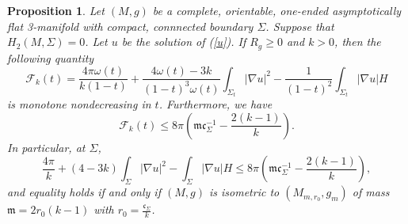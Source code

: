 \documentclass[12pt]{article}
\theoremstyle{definition}
\theoremstyle{plain}
\newtheorem{proposition}{Proposition}[section]
\numberwithin{equation}{section}
\begin{document}
\begin{proposition}\label{F mono}
Let $ (M,g) $ be a complete, orientable, one-ended asymptotically flat 3-manifold with compact, connnected boundary $ \Sigma $. Suppose that $ H_{2}(M,\Sigma)=0 $. Let $ u $ be the solution of (\ref{u}). If $ R_{g}\geq 0 $ and $ k>0 $, then the following quantity 
\begin{equation}\label{F}
\mathcal{F}_{k}(t)=\frac{4\pi\omega(t)}{k(1-t)}+\frac{4\omega(t)-3k}{(1-t)^{3}\omega(t)}\int_{\Sigma_{t}}|\nabla u|^{2}-\frac{1}{(1-t)^{2}}\int_{\Sigma_{t}}|\nabla u|H
\end{equation}
is monotone nondecreasing in $ t $. Furthermore, we have 
\begin{equation}\label{lim F}
\mathcal{F}_{k}(t)\leq 8\pi(\mathfrak{m}\mathfrak{c}_{\Sigma}^{-1}-\frac{2(k-1)}{k}).
\end{equation}
In particular, at $ \Sigma $,
\begin{equation}\label{F 0}
\frac{4\pi}{k}+(4-3k)\int_{\Sigma}|\nabla u|^{2}-\int_{\Sigma}|\nabla u|H\leq 8\pi(\mathfrak{m}\mathfrak{c}_{\Sigma}^{-1}-\frac{2(k-1)}{k}),
\end{equation}
and equality holds if and only if  $ (M,g) $ is isometric to $ (M_{m,r_{0}},g_{m}) $ of mass $ \mathfrak{m}=2r_{0}(k-1) $ with $ r_{0}=\frac{\mathfrak{c}_{\Sigma}}{k} $.
\end{proposition}
\end{document}
